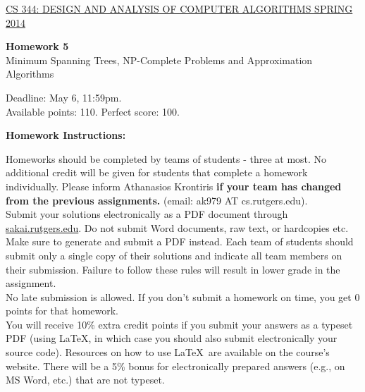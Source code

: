 \documentclass{article}
\begin{document}
\sloppy

\noindent \underline{CS 344: DESIGN AND ANALYSIS OF COMPUTER
  ALGORITHMS \hspace{1.6in} SPRING 2014}

\vspace{0.1in}

\begin{center}
{\bf {\large Homework 5}}\\
Minimum Spanning Trees, NP-Complete Problems and Approximation Algorithms\\
\end{center}

\vspace{0.1in}

\noindent Deadline: May 6, 11:59pm.\\ 
Available points: 110. Perfect score: 100.\\

\begin{center}
{\bf Homework Instructions:}
\end{center}

 Homeworks should be completed by teams of
students - three at most. No additional credit will be given for
students that complete a homework individually. Please inform
Athanasios Krontiris {\bf if your team has changed from the previous
  assignments.} (email: ak979 AT cs.rutgers.edu).\\

 Submit your solutions electronically
as a PDF document through \url{sakai.rutgers.edu}. Do not submit Word
documents, raw text, or hardcopies etc. Make sure to generate and
submit a PDF instead. Each team of students should submit only a
single copy of their solutions and indicate all team members on their
submission.  Failure to follow these rules will result in lower grade
in the assignment.\\

 No late submission is allowed. If
you don't submit a homework on time, you get 0 points for that
homework.\\

 You will receive 10\% extra
credit points if you submit your answers as a typeset PDF (using
\LaTeX, in which case you should also submit electronically your
source code). Resources on how to use \LaTeX\ are available on the
course's website. There will be a 5\% bonus for electronically
prepared answers (e.g., on MS Word, etc.) that are not typeset.\\
\end{document}
